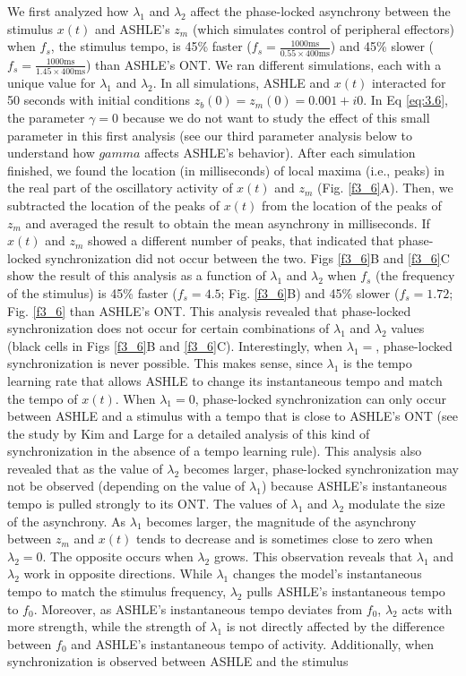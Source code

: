 \documentclass{report}
\begin{document}
We first analyzed how $\lambda_1$ and $\lambda_2$ affect the phase-locked asynchrony between the stimulus $x(t)$ and ASHLE's $z_m$ (which simulates control of peripheral effectors) when $f_s$, the stimulus tempo, is 45\% faster ($f_s = \frac{1000\text{ms}}{0.55 \times 400\text{ms}}$) and 45\% slower ($f_s = \frac{1000\text{ms}}{1.45 \times 400\text{ms}}$) than ASHLE's ONT. We ran different simulations, each with a unique value for $\lambda_1$ and $\lambda_2$. In all simulations, ASHLE and $x(t)$ interacted for 50 seconds with initial conditions $z_b(0)=z_m(0)=0.001 + i0$. In Eq \eqref{eq:3.6}, the parameter $\gamma=0$ because we do not want to study the effect of this small parameter in this first analysis (see our third parameter analysis below to understand how $gamma$ affects ASHLE's behavior). After each simulation finished, we found the location (in milliseconds) of local maxima (i.e., peaks) in the real part of the oscillatory activity of $x(t)$ and $z_m$ (Fig.{} \ref{f3_6}A). Then, we subtracted the location of the peaks of $x(t)$ from the location of the peaks of $z_m$ and averaged the result to obtain the mean asynchrony in milliseconds. If $x(t)$ and $z_m$ showed a different number of peaks, that indicated that phase-locked synchronization did not occur between the two. Figs \ref{f3_6}B and \ref{f3_6}C show the result of this analysis as a function of $\lambda_1$ and $\lambda_2$ when $f_s$ (the frequency of the stimulus) is 45\% faster ($f_s = 4.5$; Fig.{} \ref{f3_6}B) and 45\% slower ($f_s = 1.72$; Fig.{} \ref{f3_6} than ASHLE's ONT. This analysis revealed that phase-locked synchronization does not occur for certain combinations of $\lambda_1$ and $\lambda_2$ values (black cells in Figs \ref{f3_6}B and \ref{f3_6}C). Interestingly, when $\lambda_1=$, phase-locked synchronization is never possible. This makes sense, since $\lambda_1$ is the tempo learning rate that allows ASHLE to change its instantaneous tempo and match the tempo of $x(t)$. When $\lambda_1=0$, phase-locked synchronization can only occur between ASHLE and a stimulus with a tempo that is close to ASHLE's ONT (see the study by Kim and Large \cite{kim2015signal} for a detailed analysis of this kind of synchronization in the absence of a tempo learning rule). This analysis also revealed that as the value of $\lambda_2$ becomes larger, phase-locked synchronization may not be observed (depending on the value of $\lambda_1$) because ASHLE's instantaneous tempo is pulled strongly to its ONT. The values of $\lambda_1$ and $\lambda_2$ modulate the size of the asynchrony. As $\lambda_1$ becomes larger, the magnitude of the asynchrony between $z_m$ and $x(t)$ tends to decrease and is sometimes close to zero when $\lambda_2=0$. The opposite occurs when $\lambda_2$ grows. This observation reveals that $\lambda_1$ and $\lambda_2$ work in opposite directions. While $\lambda_1$ changes the model's instantaneous tempo to match the stimulus frequency, $\lambda_2$ pulls ASHLE's instantaneous tempo to $f_0$. Moreover, as ASHLE's instantaneous tempo deviates from $f_0$, $\lambda_2$ acts with more strength, while the strength of $\lambda_1$ is not directly affected by the difference between $f_0$ and ASHLE's instantaneous tempo of activity. Additionally, when synchronization is observed between ASHLE and the stimulus 
\end{document}
